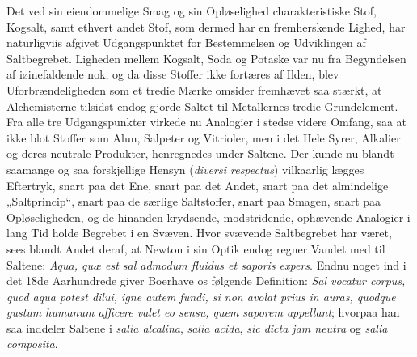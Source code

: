 \documentclass[12pt,a4paper]{book}
\begin{document}
Det ved sin eiendommelige Smag og sin Opløselighed
charakteristiske Stof, Kogsalt, samt ethvert andet Stof, som
dermed har en fremherskende Lighed, har naturligviis afgivet
Udgangspunktet for Bestemmelsen og Udviklingen af Saltbegrebet.
Ligheden mellem Kogsalt, Soda og Potaske var
nu fra Begyndelsen af iøinefaldende nok, og da disse Stoffer
ikke fortæres af Ilden, blev Uforbrændeligheden som et tredie
Mærke omsider fremhævet saa stærkt, at Alchemisterne tilsidst
endog gjorde Saltet til Metallernes tredie Grundelement.
Fra alle tre Udgangspunkter virkede nu Analogier i stedse
videre Omfang, saa at ikke blot Stoffer som Alun, Salpeter
og Vitrioler, men i det Hele Syrer, Alkalier og deres
neutrale Produkter, henregnedes under Saltene. Der kunde
nu blandt saamange og saa forskjellige Hensyn
(\textit{diversi respectus}) vilkaarlig lægges Eftertryk, snart paa det
Ene, snart paa det Andet, snart paa det almindelige „Saltprincip“,
snart paa de særlige Saltstoffer, snart paa Smagen, snart paa
Opløseligheden, og de hinanden krydsende, modstridende, ophævende
Analogier i lang Tid holde Begrebet i en Svæven.
Hvor svævende Saltbegrebet har været, sees blandt Andet
deraf, at Newton i sin Optik endog regner Vandet med til
Saltene: \textit{Aqua, quæ est sal admodum fluidus et saporis
expers}. Endnu noget ind i det 18de Aarhundrede giver
Boerhave os følgende Definition: \textit{Sal vocatur corpus, quod
aqua potest dilui, igne autem fundi, si non avolat
prius in auras, quodque gustum humanum afficere valet
eo sensu, quem saporem appellant}; hvorpaa han saa inddeler
Saltene i \textit{salia alcalina}, \textit{salia acida}, \textit{sic
dicta jam neutra} og \textit{salia composita}.
\end{document}
